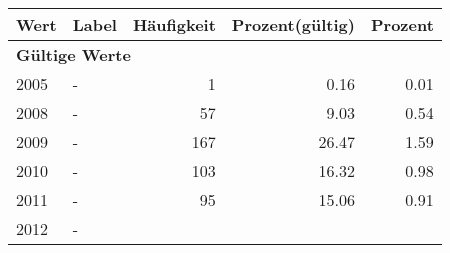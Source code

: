      \begin{longtable}{lXrrr}
     \toprule
     \textbf{Wert} & \textbf{Label} & \textbf{Häufigkeit} & \textbf{Prozent(gültig)} & \textbf{Prozent} \\
     \endhead
     \midrule
     \multicolumn{5}{l}{\textbf{Gültige Werte}}\\

     2005 &
     \multicolumn{1}{X}{ -  } &


       \num{1} &
       \num[round-mode=places,round-precision=2]{0,16} &
         \num[round-mode=places,round-precision=2]{0,01} \\

     2008 &
     \multicolumn{1}{X}{ -  } &


       \num{57} &
       \num[round-mode=places,round-precision=2]{9,03} &
         \num[round-mode=places,round-precision=2]{0,54} \\

     2009 &
     \multicolumn{1}{X}{ -  } &


       \num{167} &
       \num[round-mode=places,round-precision=2]{26,47} &
         \num[round-mode=places,round-precision=2]{1,59} \\

     2010 &
     \multicolumn{1}{X}{ -  } &


       \num{103} &
       \num[round-mode=places,round-precision=2]{16,32} &
         \num[round-mode=places,round-precision=2]{0,98} \\

     2011 &
     \multicolumn{1}{X}{ -  } &


       \num{95} &
       \num[round-mode=places,round-precision=2]{15,06} &
         \num[round-mode=places,round-precision=2]{0,91} \\

     2012 &
     \multicolumn{1}{X}{ -  } &



\end{longtable}
